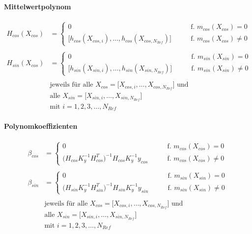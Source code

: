 \paragraph*{Mittelwertpolynom}


\begin{align}\label{eq:hmatrix}
	H_{cos}(X_{cos}) &=
		\begin{cases}
			0 															   &\qquad \text{f. } m_{cos}(X_{cos}) = 0 \\
			\big[ h_{cos}(X_{cos,i}),\ldots,h_{cos}(X_{cos,N_{Ref}}) \big] &\qquad \text{f. } m_{cos}(X_{cos}) \ne 0
		\end{cases} \nonumber \\
	\\
	H_{sin}(X_{cos}) &=
		\begin{cases}
			0															   &\qquad \text{f. } m_{sin}(X_{sin}) = 0 \\
			\big[ h_{sin}(X_{sin,i}),\ldots,h_{sin}(X_{sin,N_{Ref}}) \big] &\qquad \text{f. } m_{sin}(X_{sin}) \ne 0
		\end{cases} \nonumber \\
	\nonumber \\
	& \text{jeweils für alle } X_{cos} = \big[ X_{cos,i},\dots, X_{cos,N_{Ref}} \big] \text{ und } \nonumber \\
	& \text{alle } X_{sin} = \big[ X_{sin,i},\dots, X_{sin,N_{Ref}} \big] \nonumber \\
	& \text{mit } i = 1,2,3,\ldots,N_{Ref} \nonumber
\end{align}


\paragraph*{Polynomkoeffizienten}


\begin{align}\label{eq:betacoeffs}
	\beta_{cos} &= 
		\begin{cases}
			0 																	 &\qquad \text{f. } m_{cos}(X_{cos}) = 0\\
			\big( H_{cos} K_y^{-1} H_{cos}^T \big)^{-1} H_{cos} K_y^{-1} y_{cos} &\qquad \text{f. } m_{cos}(X_{cos}) \ne 0
		\end{cases} \nonumber \\
	\\
	\beta_{sin} &= 
		\begin{cases}
			0 																	 &\qquad \text{f. } m_{sin}(X_{sin}) = 0\\
			\big( H_{sin} K_y^{-1} H_{sin}^T \big)^{-1} H_{sin} K_y^{-1} y_{sin} &\qquad \text{f. } m_{sin}(X_{sin}) \ne 0
		\end{cases} \nonumber \\
	\nonumber \\
	& \text{jeweils für alle } X_{cos} = \big[ X_{cos,i},\dots, X_{cos,N_{Ref}} \big] \text{ und } \nonumber \\
	& \text{alle } X_{sin} = \big[ X_{sin,i},\dots, X_{sin,N_{Ref}} \big] \nonumber \\
	& \text{mit } i = 1,2,3,\ldots,N_{Ref} \nonumber
\end{align}


